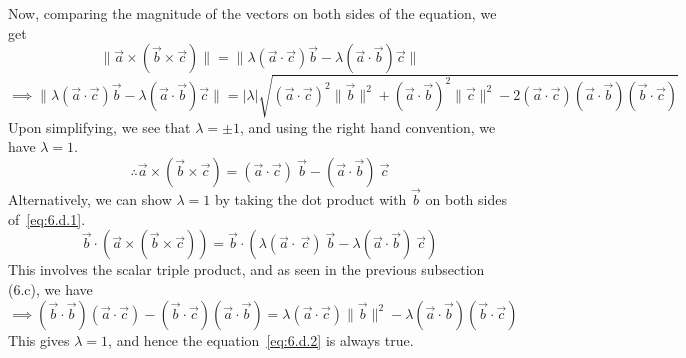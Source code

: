 Now, comparing the magnitude of the vectors on both sides of the equation, we get
\[
    \lVert \vec{a} \times (\vec{b} \times \vec{c}) \rVert
    = \lVert \lambda (\vec{a} \cdot \vec{c}) \vec{b} - \lambda (\vec{a} \cdot \vec{b}) \vec{c} \rVert
\]
\[
    \implies
    \lVert \lambda (\vec{a} \cdot \vec{c}) \vec{b} - \lambda (\vec{a} \cdot \vec{b}) \vec{c} \rVert
    = \lvert \lambda \rvert \sqrt{ {(\vec{a} \cdot \vec{c})}^2 \lVert \vec{b} \rVert ^2 + {(\vec{a} \cdot \vec{b})}^2 \lVert \vec{c} \rVert ^2 - 2 (\vec{a} \cdot \vec{c})(\vec{a} \cdot \vec{b})(\vec{b} \cdot \vec{c}) }
\]
Upon simplifying, we see that \( \lambda = \pm 1 \), and using the right hand convention, we have \( \lambda =  1 \).
\begin{equation}
    \therefore \vec{a} \times (\vec{b} \times \vec{c}) = (\vec{a} \cdot \vec{c})\ \vec{b} - (\vec{a} \cdot \vec{b})\ \vec{c}
    \tag{6.d.2}
    \label{eq:6.d.2}
\end{equation}
Alternatively, we can show \( \lambda = 1 \) by taking the dot product with \( \vec{b} \) on both sides of~\eqref{eq:6.d.1}.
\[
    \vec{b} \cdot (\vec{a} \times (\vec{b} \times \vec{c})) = \vec{b} \cdot (\lambda (\vec{a} \cdot \ \vec{c})\ \vec{b} - \lambda (\vec{a} \cdot \vec{b})\ \vec{c})
\]
This involves the scalar triple product, and as seen in the previous subsection (6.c), we have
\[
    \implies
    (\vec{b} \cdot \vec{b})(\vec{a} \cdot \vec{c}) - (\vec{b} \cdot \vec{c})(\vec{a} \cdot \vec{b})
    = \lambda (\vec{a} \cdot \vec{c}) \lVert \vec{b} \rVert^2 - \lambda (\vec{a} \cdot \vec{b})(\vec{b} \cdot \vec{c})
\]
This gives \( \lambda = 1 \), and hence the equation~\eqref{eq:6.d.2} is always true.
